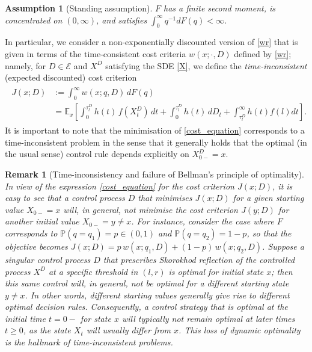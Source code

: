 \documentclass[11pt]{article} %
\newtheorem{assumption}[theorem]{Assumption}
\newtheorem{remark}[theorem]{Remark}
\def\Pr{\mathbb{P}}
\numberwithin{komcounter}{section}
\begin{document}
\begin{assumption}[Standing assumption]\label{assum:h}  
$F$ has a finite second moment, is concentrated on $(0,\infty)$, and satisfies $\textstyle{\int_0^\infty} q^{-1} dF(q) < \infty$.
\end{assumption}

In particular, we consider a non-exponentially discounted version of \eqref{wr} that is given in terms of the time-consistent cost criteria $w(x;\cdot,D)$ defined by \eqref{wr}; 
namely, for $D \in \mathcal{E}$ and $X^{D}$ satisfying the SDE \eqref{X}, we define the {\it time-inconsistent} (expected discounted) cost criterion
\begin{align} \label{cost_equation}
\begin{split}
J(x;D) &:= \int_0^\infty w(x;q,D) \, dF(q)\\
&= \mathbb{E}_x\left[ \int_0^{\tau^D_l} h(t) \, f(X^D_t) \, dt + \int_0^{\tau^D_l} h(t) \,  dD_t + \int_{\tau^D_l}^\infty h(t)f(l) dt \right].
\end{split}
\end{align}
It is important to note that the minimisation of \eqref{cost_equation} corresponds to a time-inconsistent problem in the sense that it generally holds that the optimal (in the usual sense) control rule depends explicitly on $X^D_{0-}=x$. 

\begin{remark}[Time-inconsistency and failure of Bellman’s principle of optimality] \label{rem:egBM} 
In view of the expression \eqref{cost_equation} for the cost criterion $J(x; D)$, it is easy to see that a control process $D$ that minimises $J(x; D)$ for a given starting value $X_{0-} = x$ will, in general, \textit{not} minimise the cost criterion $J(y; D)$ for another initial value $X_{0-} = y \neq x$.
For instance, consider the case where $F$ corresponds to $\Pr(q = q_1) = p \in (0,1)$ and $\Pr(q = q_2) = 1 - p$, so that the objective becomes $J(x; D) = p \, w(x; q_1, D) + (1-p) \, w(x; q_2, D)$. Suppose a singular control process $D$ that prescribes Skorokhod reflection of the controlled process $X^D$ at a specific threshold in $(l, r)$ is optimal for initial state $x$; then this same control will, in general, not be optimal for a different starting state $y \neq x$.
In other words, different starting values generally give rise to different optimal decision rules. Consequently, a control strategy that is optimal at the initial time $t = 0-$ for state $x$ will typically not remain optimal at later times $t \geq 0$, as the state $X_t$ will usually differ from $x$. This loss of dynamic optimality is the hallmark of time-inconsistent problems.
\end{remark}
\end{document}
